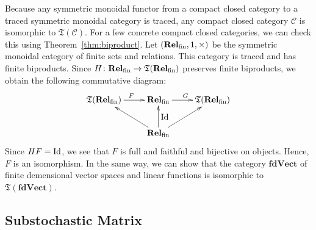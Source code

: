 Because any symmetric monoidal functor from a compact closed category
to a traced symmetric monoidal category is traced, any compact closed
category $\mathcal{C}$ is isomorphic to
$\mathfrak{T}(\mathcal{C})$. For a few concrete compact closed
categories, we can check this using Theorem~\ref{thm:biproduct}. Let
$(\mathbf{Rel}_{\mathrm{fin}},1,\times)$ be the symmetric monoidal category of finite sets
and relations. This category is traced and has finite biproducts.
Since $H \colon \mathbf{Rel}_{\mathrm{fin}} \to \mathfrak{T}(\mathbf{Rel}_{\mathrm{fin}})$ preserves finite
biproducts, we obtain the following commutative diagram:
\begin{equation*}
  \xymatrix{
    \mathfrak{T}(\fRel) \ar[r]^{F} &
    \fRel \ar[r]^{G} &
    \mathfrak{T}(\fRel) \\
    & \fRel \ar[ru] \ar[u]_{\Id} \ar[lu] &
  }
\end{equation*}
Since $HF = \mbox{Id}$, we see that $F$ is full and faithful and
bijective on objects. Hence, $F$ is an isomorphism. In the same way,
we can show that the category $\mathbf{fdVect}$ of finite
demensional vector spaces and linear functions is isomorphic to
$\mathfrak{T}(\mathbf{fdVect})$.

\subsection{Substochastic Matrix}

